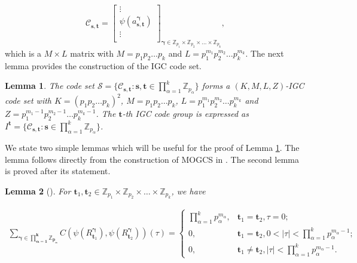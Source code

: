 \documentclass[pdflatex,sn-mathphys-num]{sn-jnl}%
\theoremstyle{thmstyleone}
\newtheorem{lemma}{Lemma}
\begin{document}
	\begin{equation}
		\mathcal{C}_{\mathbf{s}, \mathbf{t}}= 
		\begin{bmatrix}
			\vdots\\
			\psi( a_{\mathbf{s},\mathbf{t}}^{\bm{\gamma}} )\\
			\vdots\\
		\end{bmatrix}_{\bm{\gamma} \in \mathbb{Z}_{p_1} \times \mathbb{Z}_{p_2} \times \dots \times \mathbb{Z}_{p_k}},
	\end{equation}
	which is a $M \times L$ matrix with $M= p_1 p_2 \dots p_k$ and $L= p_1^{m_1} p_2^{m_2} \dots p_k^{m_k}$. The next lemma provides the construction of the IGC code set.
	
	
	\begin{lemma}\label{Thm_IGC_gen}
		The code set $\mathcal{S} = \{ \mathcal{C}_{\mathbf{s}, \mathbf{t}}: \mathbf{s}, \mathbf{t} \in \prod_{\alpha=1}^{k} \mathbb{Z}_{p_\alpha}\}$  forms a $(K,M, L,Z)$-IGC code set with $K= (p_1 p_2 \dots p_k)^2$, $M= p_1 p_2 \dots p_k$, $L= p_1^{m_1} p_2^{m_2} \dots p_k^{m_k}$ and $Z= p_1^{m_1-1} p_2^{m_2-1} \dots p_k^{m_k-1}$. The $\mathbf{t}$-th IGC code group is expressed as $I^{\mathbf{t}} = \{ \mathcal{C}_{\mathbf{s}, \mathbf{t}}: \mathbf{s} \in \prod_{\alpha=1}^{k} \mathbb{Z}_{p_\alpha}\}$.
	\end{lemma}	
	
	
	We state two simple lemmas which will be useful for the proof of Lemma \ref{Thm_IGC_gen}. The lemma follows directly from the construction of MOGCS in \cite{sarkar2021multivariable}. The second lemma is proved after its statement.
	
	\begin{lemma}[\cite{sarkar2021multivariable}]\label{lemma_CCC}
		For $\mathbf{t}_1, \mathbf{t}_2 \in \mathbb{Z}_{p_1} \times \mathbb{Z}_{p_2} \times \dots \times \mathbb{Z}_{p_k}$, we have
		
		\begin{equation}\label{Lemma_1_eqn}
			\begin{split}
				\sum_{\bm{\gamma \in \prod_{\alpha=1}^{k} \mathbb{Z}_{p_\alpha}}}^{} C\left( \psi (R_{\mathbf{t}_1}^{\bm{\gamma}} ), \psi (R_{\mathbf{t}_2}^{\bm{\gamma}} ) \right) (\tau)
				= 
				\begin{cases}
					\prod_{\alpha=1}^{k} p_\alpha^{m_\alpha}, & \mathbf{t}_1 = \mathbf{t}_2, \tau=0;\\
					0, & \mathbf{t}_1 = \mathbf{t}_2, 0< \mid \tau \mid < \prod_{\alpha=1}^{k} p_\alpha^{m_\alpha-1};\\
					0, & \mathbf{t}_1 \neq \mathbf{t}_2, \mid \tau \mid < \prod_{\alpha=1}^{k} p_\alpha^{m_\alpha-1}.
				\end{cases}
			\end{split}
		\end{equation}
	\end{lemma}
	
\end{document}
